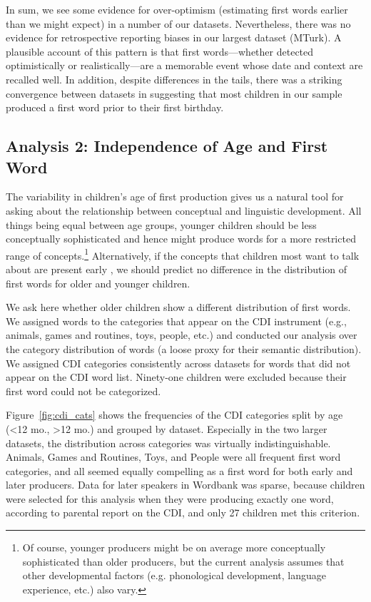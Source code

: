 \documentclass[10pt,letterpaper]{article}
\begin{document}
In sum, we see some evidence for over-optimism (estimating first words earlier than we might expect) in a number of our datasets. Nevertheless, there was no evidence for retrospective reporting biases in our largest dataset (MTurk). A plausible account of this pattern is that first words---whether detected optimistically or realistically---are a memorable event whose date and context are recalled well. In addition, despite differences in the tails, there was a striking convergence between datasets in suggesting that most children in our sample produced a first word prior to their first birthday. 

\subsection{Analysis 2: Independence of Age and First Word}

The variability in children's age of first production gives us a natural tool for asking about the relationship between conceptual and linguistic development. All things being equal between age groups, younger children should be less conceptually sophisticated and hence might produce words for a more restricted range of concepts.\footnote{Of course, younger producers might be on average more conceptually sophisticated than older producers, but the current analysis assumes that other developmental factors (e.g. phonological development, language experience, etc.) also vary.} Alternatively, if the concepts that children most want to talk about are present early \cite{snedeker2007,snedeker2012,gleitman1990}, we should predict no difference in the distribution of first words for older and younger children. 

We ask here whether older children show a different distribution of first words.  We assigned words to the categories that appear on the CDI instrument (e.g., animals, games and routines, toys, people, etc.) and conducted our analysis over the category distribution of words (a loose proxy for their semantic distribution). We assigned CDI categories consistently across datasets for words that did not appear on the CDI word list. Ninety-one children were excluded because their first word could not be categorized. 

Figure~\ref{fig:cdi_cats} shows the frequencies of the CDI categories split by age (\textless{12 mo.}, \textgreater{12 mo.}) and grouped by dataset. Especially in the two larger datasets, the distribution across categories was virtually indistinguishable. Animals, Games and Routines, Toys, and People were all frequent first word categories, and all seemed equally compelling as a first word for both early and later producers. Data for later speakers in Wordbank was sparse, because children were selected for this analysis when they were producing exactly one word, according to parental report on the CDI, and only 27 children met this criterion.
\end{document}
